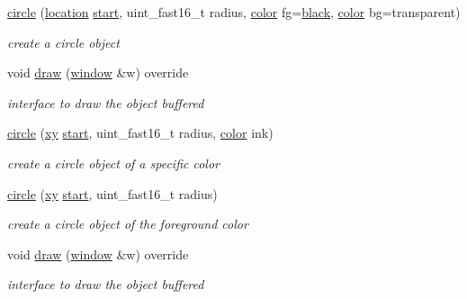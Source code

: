 \begin{DoxyCompactItemize}
\item 
\mbox{\label{classhwlib_1_1circle_a1aeb184559094cd455833d2f4dd83dc0}} 
\hyperlink{classhwlib_1_1circle_a1aeb184559094cd455833d2f4dd83dc0}{circle} (\hyperlink{classhwlib_1_1location}{location} \hyperlink{classhwlib_1_1drawable_a6c31bc9303840a4317d3c95250c357ce}{start}, uint\+\_\+fast16\+\_\+t radius, \hyperlink{classhwlib_1_1color}{color} fg=\hyperlink{namespacehwlib_aa9c056fa29bc9af9f55d4b774bb3898a}{black}, \hyperlink{classhwlib_1_1color}{color} bg=transparent)
\begin{DoxyCompactList}\small\item\em create a circle object \end{DoxyCompactList}\item 
void \hyperlink{classhwlib_1_1circle_a7a4d6bbd0692b757eee4615a8c5ea9f4}{draw} (\hyperlink{classhwlib_1_1window}{window} \&w) override
\begin{DoxyCompactList}\small\item\em interface to draw the object buffered \end{DoxyCompactList}\item 
\mbox{\label{classhwlib_1_1circle_a1516f6f0af132e1ef4a050d5cd0eaf2d}} 
\hyperlink{classhwlib_1_1circle_a1516f6f0af132e1ef4a050d5cd0eaf2d}{circle} (\hyperlink{classhwlib_1_1xy}{xy} \hyperlink{classhwlib_1_1drawable_a6c31bc9303840a4317d3c95250c357ce}{start}, uint\+\_\+fast16\+\_\+t radius, \hyperlink{classhwlib_1_1color}{color} ink)
\begin{DoxyCompactList}\small\item\em create a circle object of a specific color \end{DoxyCompactList}\item 
\mbox{\label{classhwlib_1_1circle_ab461754713a88ae8d5e8ab5a2e01a14b}} 
\hyperlink{classhwlib_1_1circle_ab461754713a88ae8d5e8ab5a2e01a14b}{circle} (\hyperlink{classhwlib_1_1xy}{xy} \hyperlink{classhwlib_1_1drawable_a6c31bc9303840a4317d3c95250c357ce}{start}, uint\+\_\+fast16\+\_\+t radius)
\begin{DoxyCompactList}\small\item\em create a circle object of the foreground color \end{DoxyCompactList}\item 
void \hyperlink{classhwlib_1_1circle_a7a4d6bbd0692b757eee4615a8c5ea9f4}{draw} (\hyperlink{classhwlib_1_1window}{window} \&w) override
\begin{DoxyCompactList}\small\item\em interface to draw the object buffered \end{DoxyCompactList}\end{DoxyCompactItemize}
